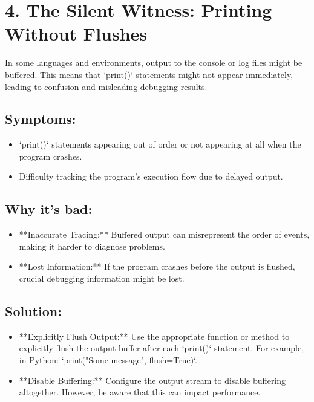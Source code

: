 \documentclass{article}
\begin{document}
\section*{4. The Silent Witness: Printing Without Flushes}

In some languages and environments, output to the console or log files might be buffered. This means that `print()` statements might not appear immediately, leading to confusion and misleading debugging results.

\subsection*{Symptoms:}

\begin{itemize}
    \item  `print()` statements appearing out of order or not appearing at all when the program crashes.
    \item Difficulty tracking the program's execution flow due to delayed output.
\end{itemize}

\subsection*{Why it's bad:}

\begin{itemize}
    \item **Inaccurate Tracing:**  Buffered output can misrepresent the order of events, making it harder to diagnose problems.
    \item **Lost Information:**  If the program crashes before the output is flushed, crucial debugging information might be lost.
\end{itemize}

\subsection*{Solution:}

\begin{itemize}
    \item **Explicitly Flush Output:**  Use the appropriate function or method to explicitly flush the output buffer after each `print()` statement.  For example, in Python: `print("Some message", flush=True)`.
    \item **Disable Buffering:** Configure the output stream to disable buffering altogether. However, be aware that this can impact performance.
\end{itemize}
\end{document}

